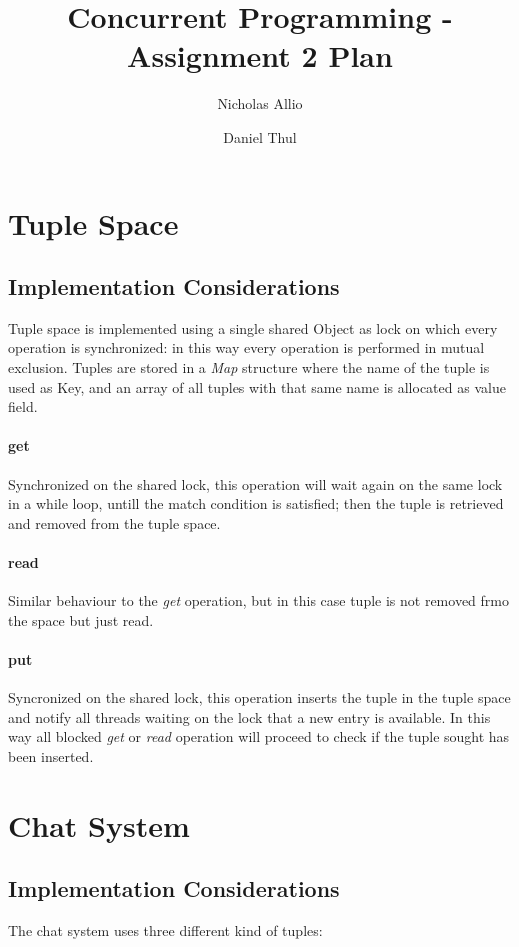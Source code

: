 \documentclass[10pt,a4paper]{article}
\author{Nicholas Allio \and Daniel Thul}
\title{Concurrent Programming - Assignment 2 Plan}
\begin{document}
\maketitle

\section{Tuple Space}

\subsection{Implementation Considerations}

Tuple space is implemented using a single shared Object as lock on which every operation is synchronized: in this way every operation is performed in mutual exclusion.
Tuples are stored in a \textit{Map} structure where the name of the tuple is used as Key, and an array of all tuples with that same name is allocated as value field.

\paragraph{get} Synchronized on the shared lock, this operation will wait again on the same lock in a while loop, untill the match condition is satisfied; then the tuple is retrieved and removed from the tuple space.

\paragraph{read} Similar behaviour to the \textit{get} operation, but in this case tuple is not removed frmo the space but just read.

\paragraph{put} Syncronized on the shared lock, this operation inserts the tuple in the tuple space and notify all threads waiting on the lock that a new entry is available. In this way all blocked \textit{get} or \textit{read} operation will proceed to check if the tuple sought has been inserted.

\section{Chat System}

\subsection{Implementation Considerations}
The chat system uses three different kind of tuples:\par
\end{document}

